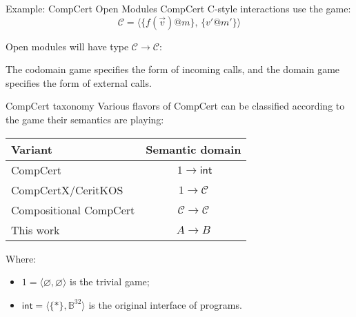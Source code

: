 \documentclass{beamer}
\newcommand{\kw}[1]{\ensuremath{ \mathsf{#1} }}
\begin{document}
\begin{frame}{Example: CompCert Open Modules}
CompCert C-style interactions
use the game:
\[ \mathcal{C} = \langle \{ f(\vec{v})@m \}, \, \{ v'@m' \} \rangle \]

Open modules will have type $\mathcal{C} \rightarrow \mathcal{C}$:
\begin{center}
\end{center}

The codomain game specifies the form of incoming calls,
and the domain game specifies the form of external calls.
\end{frame}

\begin{frame}{CompCert taxonomy} %
Various flavors of CompCert can be classified according to
the game their semantics are playing:
\begin{center}
  \begin{tabular}{lc}
    \hline
    Variant & Semantic domain \\
    \hline
    CompCert  & $\ 1 \rightarrow \kw{int}$ \\
    CompCertX/CeritKOS & $1 \rightarrow \mathcal{C}$ \\
    Compositional CompCert & $\mathcal{C} \rightarrow \mathcal{C}$ \\
    This work & $A \rightarrow B$ \\
    \hline
  \end{tabular}
\end{center}

\vspace{1ex}
Where:
\begin{itemize}
\item $1 = \langle \varnothing, \varnothing \rangle$
  is the trivial game;
\item $\kw{int} = \langle \{*\}, \mathbb{B}^{32} \rangle$
  is the original interface of programs.
\end{itemize}
\end{frame}
\end{document}
